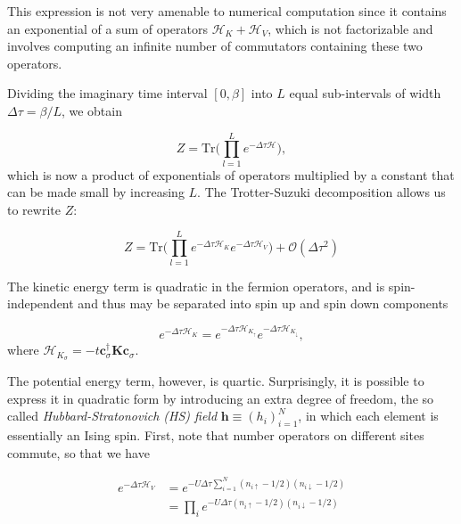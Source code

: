 \documentclass[10pt, twocolumn, twoside]{article}
\begin{document}
This expression is not very amenable to numerical computation since it contains an exponential of a sum of operators $\mathcal{H}_K + \mathcal{H}_V$, which is not factorizable and involves computing an infinite number of commutators containing these two operators.

Dividing the imaginary time interval $[0, \beta ]$ into $L$ equal sub-intervals of width $\Delta \tau = \beta / L$, we obtain

\begin{equation}
Z = \text{Tr} \bigg( \prod_{l=1}^L e^{-\Delta\tau \mathcal{H} } \bigg) ,
\end{equation}
which is now a product of exponentials of operators multiplied by a constant that can be made small by increasing $L$. The Trotter-Suzuki decomposition allows us to rewrite $Z$:

\begin{equation}\label{eq:Z_propagator}
Z = \text{Tr} \bigg( \prod_{l=1}^L e^{-\Delta\tau \mathcal{H}_K } e^{-\Delta\tau \mathcal{H}_V } \bigg) + \mathcal{O}(\Delta \tau^2) 
\end{equation}

The kinetic energy term is quadratic in the fermion operators, and is spin-independent and thus may be separated into spin up and spin down components

\begin{equation}
e^{-\Delta\tau \mathcal{H}_K} = e^{-\Delta\tau \mathcal{H}_{K_\uparrow}} e^{-\Delta\tau \mathcal{H}_{K_\downarrow}} ,
\end{equation}
where $\mathcal{H}_{K_\sigma} = -t \bm c_\sigma^\dagger \bm K  \bm c_\sigma$.

The potential energy term, however, is quartic. Surprisingly, it is possible to express it in quadratic form by introducing an extra degree of freedom, the so called \emph{Hubbard-Stratonovich (HS) field} $\bm h \equiv (h_i)_{i=1}^N$, in which each element is essentially an Ising spin. First, note that number operators on different sites commute, so that we have

\begin{equation}
\begin{split}
e^{-\Delta\tau \mathcal{H}_V} &= e^{-U \Delta\tau \sum_{i=1}^N (n_{i\uparrow} - 1/2 ) (n_{i\downarrow} - 1/2 )} \\
&= \prod_i e^{-U \Delta\tau (n_{i\uparrow} - 1/2 ) (n_{i\downarrow} - 1/2 )}
\end{split}
\end{equation}
\end{document}
